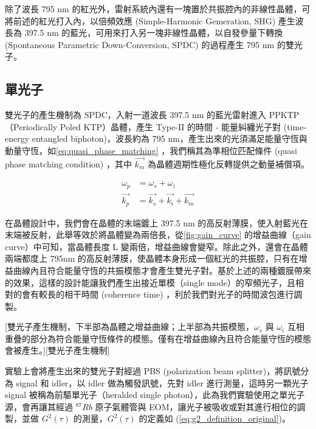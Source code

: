 \documentclass[class=NCU_thesis, crop=false]{standalone}
\begin{document}
除了波長 795 nm 的紅光外，雷射系統內還有一塊置於共振腔內的非線性晶體，可將前述的紅光打入內，以倍頻效應 (Simple-Harmonic Gemeration, SHG) 產生波長為 397.5 nm 的藍光，可用來打入另一塊非線性晶體，以自發參量下轉換 (Spontaneous Parametric Down-Conversion, SPDC) 的過程產生 795 nm 的雙光子。

\subsection{單光子}
\label{subsection:single_photon}
雙光子的產生機制為 SPDC，入射一道波長 397.5 nm 的藍光雷射進入 PPKTP （Periodically Poled KTP）晶體，產生 Type-II 的時間 - 能量糾纏光子對 (time-energy entangled biphoton)，波長約為 795 nm，產生出來的光須滿足能量守恆與動量守恆，如\cref{eq:quasi_phase_matching} ，我們稱其為準相位匹配條件 (quasi phase matching condition) ，其中 $\vec{k_m}$ 為晶體週期性極化反轉提供之動量補償項。

\begin{equation}
\begin{split}
    \omega_p &=\omega_s+\omega_i\\
    \vec{k_p} &=\vec{k_s}+\vec{k_i}+\vec{k_m}
\label{eq:quasi_phase_matching}  
\end{split}
\end{equation}
    

在晶體設計中，我們會在晶體的末端鍍上 397.5 nm 的高反射薄膜，使入射藍光在末端被反射，此舉等效於將晶體變為兩倍長，從\cref{fig:gain_curve} 的增益曲線（gain curve）中可知，當晶體長度 L 變兩倍，增益曲線會變窄\cite{chuu2012miniature}。除此之外，還會在晶體兩端都度上 795nm 的高反射薄膜，使晶體本身形成一個紅光的共振腔，只有在增益曲線內且符合能量守恆的共振模態才會產生雙光子對。基於上述的兩種鍍膜帶來的效果，這樣的設計能讓我們產生出接近單模（single mode）的窄頻光子\cite{wu2017bright}，且相對的會有較長的相干時間 (coherence time) ，利於我們對光子的時間波包進行調製。

[雙光子產生機制，下半部為晶體之增益曲線；上半部為共振模態，$\omega_s$ 與 $\omega_i$ 互相重疊的部分為符合能量守恆條件的模態。僅有在增益曲線內且符合能量守恆的模態會被產生。][雙光子產生機制]

實驗上會將產生出來的雙光子對經過 PBS (polarization beam splitter)，將訊號分為 signal 和 idler，以 idler 做為觸發訊號，先對 idler 進行測量，這時另一顆光子 signal 被稱為前驅單光子（heralded single photon），此為我們實驗使用之單光子源，會再讓其經過 $^{87}Rb$ 原子氣體管與 EOM，讓光子被吸收或對其進行相位的調製，並做 $G^{2}(\tau)$\cite{PhysRevLett.101.103601} 的測量，$G^{2}(\tau)$ 的定義如 (\ref{eq:g2_definition_original})。
\end{document}
